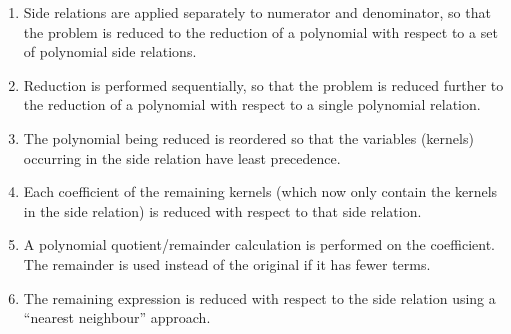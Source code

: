 \begin{enumerate}
\item Side relations are applied separately to numerator and denominator, so
that the problem is reduced to the reduction of a polynomial with respect to
a set of polynomial side relations.

\item Reduction is performed sequentially, so that the problem is reduced
further to the reduction of a polynomial with respect to a single
polynomial relation.

\item The polynomial being reduced is reordered so that the variables
(kernels) occurring in the side relation have least precedence.

\item Each coefficient of the remaining kernels (which now only contain
the kernels
in the side relation) is reduced with respect to that side relation.

\item A polynomial quotient/remainder calculation is performed on the
coefficient.  The remainder is
used instead of the original if it has fewer terms.

\item The remaining expression is reduced with respect to the side relation
using a ``nearest neighbour'' approach.
\end{enumerate}

